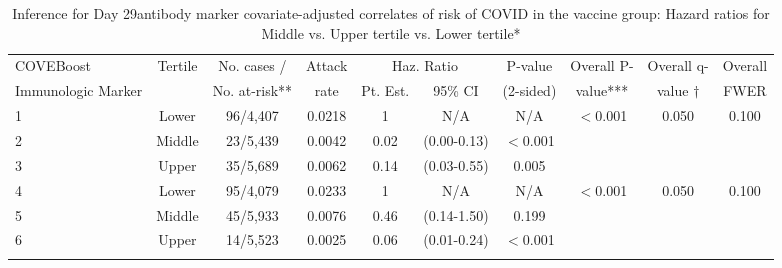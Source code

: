 \begin{longtable}{lccccccccc}
\caption{Inference for Day 29antibody marker covariate-adjusted correlates of risk of COVID in the vaccine group: Hazard ratios for Middle vs. Upper tertile vs. Lower tertile*} \\ 
   \hline
 
         \multicolumn{1}{l}{COVEBoost} & \multicolumn{1}{c}{Tertile}   & \multicolumn{1}{c}{No. cases /}   & \multicolumn{1}{c}{Attack}   & \multicolumn{2}{c}{Haz. Ratio}                     & \multicolumn{1}{c}{P-value}   & \multicolumn{1}{c}{Overall P-}      & \multicolumn{1}{c}{Overall q-}   & \multicolumn{1}{c}{Overall} \\ 
         \multicolumn{1}{l}{Immunologic Marker}            & \multicolumn{1}{c}{}          & \multicolumn{1}{c}{No. at-risk**} & \multicolumn{1}{c}{rate}   & \multicolumn{1}{c}{Pt. Est.} & \multicolumn{1}{c}{95\% CI} & \multicolumn{1}{c}{(2-sided)} & \multicolumn{1}{c}{value***} & \multicolumn{1}{c}{value $\dagger$} & \multicolumn{1}{c}{FWER} \\ 
         \hline
 
    1 & Lower & 96/4,407 & 0.0218 & 1 & N/A & N/A & $<$0.001 & 0.050 & 0.100 \\ 
  2 & Middle & 23/5,439 & 0.0042 & 0.02 & (0.00-0.13) & $<$0.001 &     &  &  \\ 
  3 & Upper & 35/5,689 & 0.0062 & 0.14 & (0.03-0.55) & 0.005 &     &  &  \\ 
  4 & Lower & 95/4,079 & 0.0233 & 1 & N/A & N/A & $<$0.001 & 0.050 & 0.100 \\ 
  5 & Middle & 45/5,933 & 0.0076 & 0.46 & (0.14-1.50) & 0.199 &     &  &  \\ 
  6 & Upper & 14/5,523 & 0.0025 & 0.06 & (0.01-0.24) & $<$0.001 &     &  &  \\ 
   \hline
\hline
\label{tab:CoR_univariable_svycoxph_cat_pretty}
\end{longtable}
